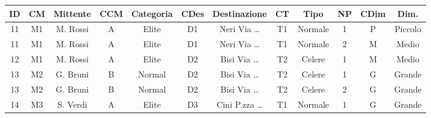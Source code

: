 \documentclass{standalone}
\begin{document}
\begin{tabular}{|c|c|c|c|c|c|c|c|c|c|c|c|}
    \hline
    ID&CM&Mittente&CCM&Categoria&CDes&Destinazione&CT&Tipo&NP&CDim&Dim.\\
    \hline
    11&M1&M. Rossi&A&Elite&D1&Neri Via \dots&T1&Normale&1&P&Piccolo\\
    \hline
    11&M1&M. Rossi&A&Elite&D1&Neri Via \dots&T1&Normale&2&M&Medio\\
    \hline
    12&M1&M. Rossi&A&Elite&D2&Bisi Via \dots&T2&Celere&1&M&Medio\\
    \hline
    13&M2&G. Bruni&B&Normal&D2&Bisi Via \dots&T2&Celere&1&G&Grande\\
    \hline
    13&M2&G. Bruni&B&Normal&D2&Bisi Via \dots&T2&Celere&2&G&Grande\\
    \hline
    14&M3&S. Verdi&A&Elite&D3&Cini P.zza \dots&T1&Normale&1&G&Grande\\
    \hline
\end{tabular}
\end{document}
